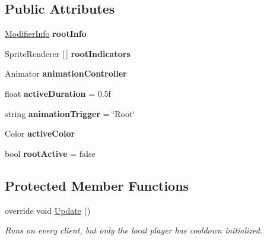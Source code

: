 \subsection*{Public Attributes}
\begin{DoxyCompactItemize}
\item 
\hypertarget{class_boomerang_root_a02e720eee940d03eecbb57f643ea6a56}{}\label{class_boomerang_root_a02e720eee940d03eecbb57f643ea6a56} 
\hyperlink{struct_modifier_info}{Modifier\+Info} {\bfseries root\+Info}
\item 
\hypertarget{class_boomerang_root_a3bb863a38b0e4b411a17efdff9595685}{}\label{class_boomerang_root_a3bb863a38b0e4b411a17efdff9595685} 
Sprite\+Renderer \mbox{[}$\,$\mbox{]} {\bfseries root\+Indicators}
\item 
\hypertarget{class_boomerang_root_a7b45e9cefc338ce7f61a8d820f2b93ee}{}\label{class_boomerang_root_a7b45e9cefc338ce7f61a8d820f2b93ee} 
Animator {\bfseries animation\+Controller}
\item 
\hypertarget{class_boomerang_root_a4730a710b48626086e7a52d509b4274f}{}\label{class_boomerang_root_a4730a710b48626086e7a52d509b4274f} 
float {\bfseries active\+Duration} = 0.\+5f
\item 
\hypertarget{class_boomerang_root_ac2168a45ea9d06ff91b729b7ea1dcbbd}{}\label{class_boomerang_root_ac2168a45ea9d06ff91b729b7ea1dcbbd} 
string {\bfseries animation\+Trigger} = \char`\"{}Root\char`\"{}
\item 
\hypertarget{class_boomerang_root_a581c26825eab5fb5e6a58555c08f9f34}{}\label{class_boomerang_root_a581c26825eab5fb5e6a58555c08f9f34} 
Color {\bfseries active\+Color}
\item 
\hypertarget{class_boomerang_root_a0bee154a42174d7007834ce1236f55f7}{}\label{class_boomerang_root_a0bee154a42174d7007834ce1236f55f7} 
bool {\bfseries root\+Active} = false
\end{DoxyCompactItemize}
\subsection*{Protected Member Functions}
\begin{DoxyCompactItemize}
\item 
override void \hyperlink{class_boomerang_root_ae237190bc2d4dbddcf21a25ee3c96dc9}{Update} ()
\begin{DoxyCompactList}\small\item\em Runs on every client, but only the local player has cooldown initialized. \end{DoxyCompactList}\end{DoxyCompactItemize}
